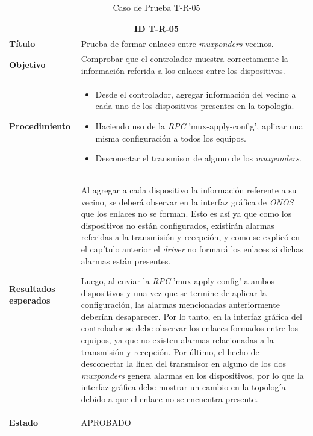   \begin{table}[H]
    \centering
    \begin{tabular}{ |m{2.5cm}|m{11cm}|  }
    \hline
    \multicolumn{2}{|c|}{ \textbf{ID T-R-05} } \\
    \hline
    \centering
    \textbf{Título} & Prueba de formar enlaces entre \textit{muxponders} vecinos.  \\
    \hline
    \centering
    \textbf{Objetivo} & Comprobar que el controlador muestra correctamente la información referida a los enlaces entre los dispositivos.   \\
    \hline
    \centering
    \textbf{Procedimiento} & \begin{itemize}
      \item Desde el controlador, agregar información del vecino a cada uno de los dispositivos presentes en la topología.
      \item Haciendo uso de la \textit{RPC} 'mux-apply-config', aplicar una misma configuración a todos los equipos. 
      \item Desconectar el transmisor de alguno de los \textit{muxponders}.
    \end{itemize}     \\
    \hline
    \centering
    \textbf{Resultados esperados} & 
    Al agregar a cada dispositivo la información referente a su vecino, se deberá observar en la interfaz gráfica de \textit{ONOS} que los enlaces no se forman. Esto es así ya que como los dispositivos no están configurados, existirán alarmas referidas a la transmisión y recepción, y como se explicó en el capítulo anterior el \textit{driver} no formará los enlaces si dichas alarmas están presentes. 

Luego, al enviar la \textit{RPC} 'mux-apply-config' a ambos dispositivos y una vez que se termine de aplicar la configuración, las alarmas mencionadas anteriormente deberían desaparecer. Por lo tanto, en la interfaz gráfica del controlador se debe observar los enlaces formados entre los equipos, ya que no existen alarmas relacionadas a la transmisión y recepción.
Por último, el hecho de desconectar la línea del transmisor en alguno de los dos \textit{muxponders} genera alarmas en los dispositivos, por lo que la interfaz gráfica debe mostrar un cambio en la topología debido a que el enlace no se encuentra presente.  
      \\
    
      \hline
    \centering
      \textbf{Estado}    & APROBADO  \\
    \hline
    \end{tabular}
    
    \caption{Caso de Prueba T-R-05}
    \label{tab:TR05}
    \end{table}

